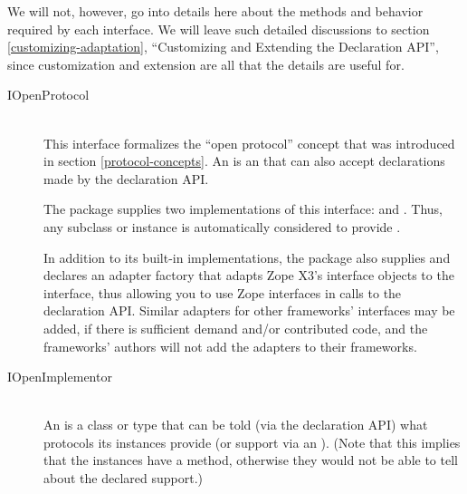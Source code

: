 \begin{verbatim%
}
\begin{verbatim%
}
\begin{verbatim%
}
\begin{verbatim%
}
We will not, however, go into details here about the methods and behavior
required by each interface.  We will leave such detailed discussions to
section \ref{customizing-adaptation}, ``Customizing and Extending the
Declaration API'', since customization and extension are all that the
details are useful for.

\begin{description}










\item[IOpenProtocol] \hfill \\
This interface formalizes the ``open protocol'' concept that was introduced
in section \ref{protocol-concepts}.  An  is an
 that can also accept declarations made by the
 declaration API.

The  package supplies two implementations of this interface:
 and .  Thus, any 
subclass or  instance is automatically considered to provide
.  

In addition to its built-in implementations, the  package
also supplies and declares an adapter factory that adapts Zope X3's
interface objects to the  interface, thus allowing
you to use Zope interfaces in calls to the declaration API.  Similar adapters
for other frameworks' interfaces may be added, if there is sufficient demand
and/or contributed code, and the frameworks' authors will not add the adapters
to their frameworks.


\item[IOpenImplementor] \hfill \\
An  is a class or type that can be told (via the
declaration API) what protocols its instances provide (or support via an
).  (Note that this implies that the instances have
a  method, otherwise they would not be able to tell
 about the declared support.)


\end{description}
\end{verbatim%
}
\end{verbatim%
}
\end{verbatim%
}
\end{verbatim%
}
